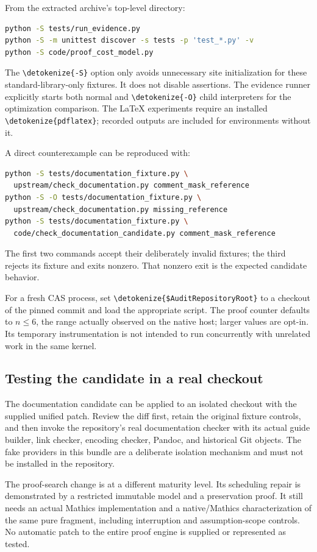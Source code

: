 \documentclass[11pt,letterpaper]{article}
\newcommand{\code}[1]{\expandafter\nolinkurl\expandafter{\detokenize{#1}}}
\begin{document}
{From the extracted archive's top-level directory:
\begin{lstlisting}[language=bash]
python -S tests/run_evidence.py
python -S -m unittest discover -s tests -p 'test_*.py' -v
python -S code/proof_cost_model.py
\end{lstlisting}

The \code{-S} option only avoids unnecessary site initialization for these standard-library-only fixtures. It does not disable assertions. The evidence runner explicitly starts both normal and \code{-O} child interpreters for the optimization comparison. The LaTeX experiments require an installed \code{pdflatex}; recorded outputs are included for environments without it.

A direct counterexample can be reproduced with:
\begin{lstlisting}[language=bash]
python -S tests/documentation_fixture.py \
  upstream/check_documentation.py comment_mask_reference
python -S -O tests/documentation_fixture.py \
  upstream/check_documentation.py missing_reference
python -S tests/documentation_fixture.py \
  code/check_documentation_candidate.py comment_mask_reference
\end{lstlisting}
The first two commands accept their deliberately invalid fixtures; the third rejects its fixture and exits nonzero. That nonzero exit is the expected candidate behavior.

For a fresh CAS process, set \code{$AuditRepositoryRoot} to a checkout of the pinned commit and load the appropriate script. The proof counter defaults to $n\leq6$, the range actually observed on the native host; larger values are opt-in. Its temporary instrumentation is not intended to run concurrently with unrelated work in the same kernel.

\subsection{Testing the candidate in a real checkout}

The documentation candidate can be applied to an isolated checkout with the supplied unified patch. Review the diff first, retain the original fixture controls, and then invoke the repository's real documentation checker with its actual guide builder, link checker, encoding checker, Pandoc, and historical Git objects. The fake providers in this bundle are a deliberate isolation mechanism and must not be installed in the repository.

The proof-search change is at a different maturity level. Its scheduling repair is demonstrated by a restricted immutable model and a preservation proof. It still needs an actual Mathics implementation and a native/Mathics characterization of the same pure fragment, including interruption and assumption-scope controls. No automatic patch to the entire proof engine is supplied or represented as tested.

}
\end{document}
